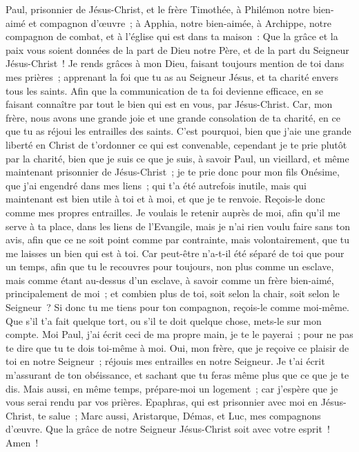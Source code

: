 \begin{multicols}{2}
\VerseOne{}Paul, prisonnier de Jésus-Christ, et le frère Timothée, à Philémon notre bien-aimé et compagnon d'œuvre~;
à Apphia, notre bien-aimée, à Archippe, notre compagnon de combat, et à l'église qui est dans ta maison~:
Que la grâce et la paix vous soient données de la part de Dieu notre Père, et de la part du Seigneur Jésus-Christ~!
Je rends grâces à mon Dieu, faisant toujours mention de toi dans mes prières~;
apprenant la foi que tu as au Seigneur Jésus, et ta charité envers tous les saints.
Afin que la communication de ta foi devienne efficace, en se faisant connaître par tout le bien qui est en vous, par Jésus-Christ.
Car, mon frère, nous avons une grande joie et une grande consolation de ta charité, en ce que tu as réjoui les entrailles des saints.
C'est pourquoi, bien que j'aie une grande liberté en Christ de t'ordonner ce qui est convenable,
cependant je te prie plutôt par la charité, bien que je suis ce que je suis, à savoir Paul, un vieillard, et même maintenant prisonnier de Jésus-Christ~;
je te prie donc pour mon fils Onésime, que j'ai engendré dans mes liens~;
qui t'a été autrefois inutile, mais qui maintenant est bien utile à toi et à moi, et que je te renvoie.
Reçois-le donc comme mes propres entrailles.
Je voulais le retenir auprès de moi, afin qu'il me serve à ta place, dans les liens de l'Evangile,
mais je n'ai rien voulu faire sans ton avis, afin que ce ne soit point comme par contrainte, mais volontairement, que tu me laisses un bien qui est à toi.
Car peut-être n'a-t-il été séparé de toi que pour un temps, afin que tu le recouvres pour toujours,
non plus comme un esclave, mais comme étant au-dessus d'un esclave, à savoir comme un frère bien-aimé, principalement de moi~; et combien plus de toi, soit selon la chair, soit selon le Seigneur~?
Si donc tu me tiens pour ton compagnon, reçois-le comme moi-même.
Que s'il t'a fait quelque tort, ou s'il te doit quelque chose, mets-le sur mon compte.
Moi Paul, j'ai écrit ceci de ma propre main, je te le payerai~; pour ne pas te dire que tu te dois toi-même à moi.
Oui, mon frère, que je reçoive ce plaisir de toi en notre Seigneur~; réjouis mes entrailles en notre Seigneur.
Je t'ai écrit m'assurant de ton obéissance, et sachant que tu feras même plus que ce que je te dis.
Mais aussi, en même temps, prépare-moi un logement~; car j'espère que je vous serai rendu par vos prières.
Epaphras, qui est prisonnier avec moi en Jésus-Christ, te salue~;
Marc aussi, Aristarque, Démas, et Luc, mes compagnons d'œuvre.
Que la grâce de notre Seigneur Jésus-Christ soit avec votre esprit~! Amen~!
\PPE{}
\end{multicols}
